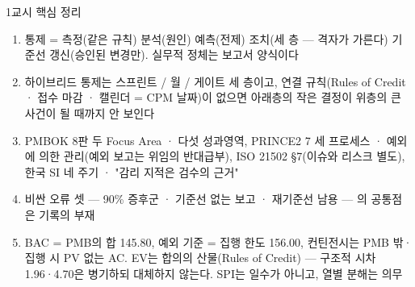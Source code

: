 \begin{frame}{1교시 핵심 정리}
\begin{enumerate}
\item 통제 = 측정(같은 규칙) \ra{} 분석(원인) \ra{} 예측(전제) \ra{} 조치(세 층 — 격자가 가른다) \ra{} 기준선 갱신(승인된 변경만). 실무적 정체는 보고서 양식이다
\item 하이브리드 통제는 스프린트 / 월 / 게이트 세 층이고, 연결 규칙(Rules of Credit · 접수 마감 · 캘린더 = CPM 날짜)이 없으면 아래층의 작은 결정이 위층의 큰 사건이 될 때까지 안 보인다
\item PMBOK 8판 두 Focus Area · 다섯 성과영역, PRINCE2 7 세 프로세스 · 예외에 의한 관리(예외 보고는 위임의 반대급부), ISO 21502 §7(이슈와 리스크 별도), 한국 SI 네 주기 · "감리 지적은 검수의 근거"
\item 비싼 오류 셋 — 90\% 증후군 · 기준선 없는 보고 · 재기준선 남용 — 의 공통점은 기록의 부재
\item BAC = PMB의 합 145.80, 예외 기준 = 집행 한도 156.00, 컨틴전시는 PMB 밖·집행 시 PV 없는 AC. EV는 합의의 산물(Rules of Credit) — 구조적 시차 1.96·4.70은 병기하되 대체하지 않는다. SPI는 일수가 아니고, 열별 분해는 의무
\end{enumerate}
\end{frame}
